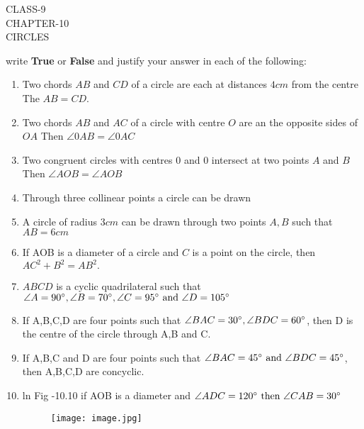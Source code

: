 \documentclass[12pt]{article}
\begin{document}
\begin{center}
\textbf\large{CLASS-9\\CHAPTER-10 \\ CIRCLES}
\end{center}
write \textbf{True} or \textbf{False} and justify your answer in each of the following:
\begin{enumerate}
\item Two chords $AB$ and $CD$ of a circle are each at distances $4 cm$ from the centre The $AB=CD$.
\item Two chords $AB$ and $AC$ of a circle with centre $O$ are an the opposite sides of $OA$ Then $\angle 0AB = \angle 0AC$
\item Two congruent circles with centres 0 and 0 intersect at two points $A$ and $B$ Then $\angle AOB= \angle AOB$
\item Through three collinear points a circle can be drawn
\item A circle of radius $3 cm$ can be drawn through two points $A,B$ such that $AB= 6cm$
\item If AOB is a diameter of a circle and $C$ is a point on the circle, then $AC^2+B^2=AB^2.$
\item $ABCD$ is a cyclic quadrilateral such that $\angle A=90\degree ,\angle B=70\degree, \angle C=95\degree \text{ and }\angle D=105\degree$
\item If A,B,C,D are four points such that $\angle BAC=30\degree, \angle BDC=60\degree$, then D is the centre of the circle through A,B  and C.
\item If A,B,C and D are four points such that $\angle BAC =45\degree \text{ and }\angle BDC=45\degree$, then A,B,C,D are concyclic.
\item ln Fig -10.10 if AOB is a diameter and $\angle ADC=120\degree \text{ then }\angle CAB=30\degree$
\begin{figure}[h!]
 \begin{center} 
	 \texttt{[image: image.jpg]}
 \end{center}
\caption{}
	\label{}
\end{figure}
\end{enumerate}
\end{document}
